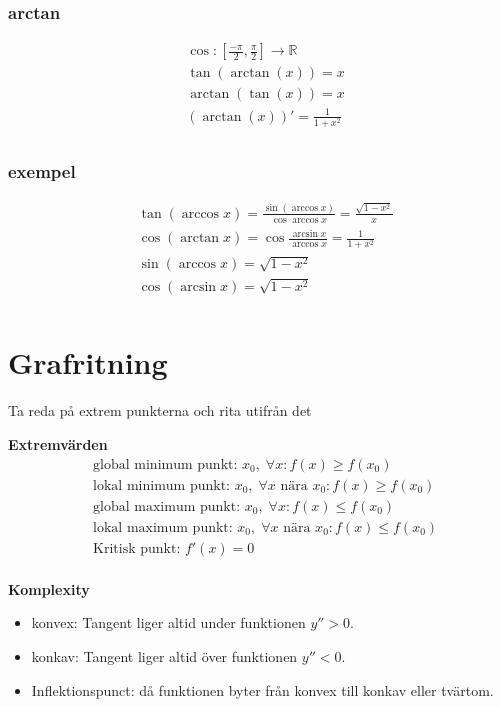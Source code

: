 \begin{multicols}{2}
  \subsubsection{arctan}
  \begin{align*}
    &\cos: [\frac{-\pi}{2},\frac{\pi}{2}] \to \mathbb{R} \\
    &\tan(\arctan(x))=x \\  
    &\arctan(\tan(x))=x \\
    &(\arctan(x))'= \frac{1}{1+x^2} \\
  \end{align*}

  \subsubsection{exempel}
  \begin{align*}
    &\tan{(\arccos{x})} = \frac{\sin{(\arccos{x})}}{\cos{\arccos{x}}}= \frac{\sqrt{1-x^2}}{x} \\
    &\cos{(\arctan{x})} = \cos{\frac{\arcsin{x}}{\arccos{x}}}= \frac{1}{1+x^2} \\ %
    &\sin{(\arccos{x})} = \sqrt{1-x^2} \\
    &\cos{(\arcsin{x})} = \sqrt{1-x^2} \\
  \end{align*}


  \section{Grafritning}
  Ta reda på extrem punkterna och rita utifrån det

  \textbf{Extremvärden}
  \begin{align*}
    &\text{global minimum punkt: } x_0, \; \forall x: f(x) \geq f(x_0) \\
    &\text{lokal minimum punkt: } x_0, \; \forall x \text{ nära } x_0: f(x) \geq f(x_0) \\
    &\text{global maximum punkt: } x_0, \; \forall x: f(x) \leq f(x_0) \\
    &\text{lokal maximum punkt: } x_0, \; \forall x \text{ nära } x_0: f(x) \leq f(x_0) \\
    &\text{Kritisk punkt: } f'(x)=0 \\
  \end{align*}


  \textbf{Komplexity}
  \begin{itemize}
    \item konvex: Tangent liger altid under funktionen $y''>0$.
    \item konkav: Tangent liger altid över funktionen $y''<0$.
    \item Inflektionspunct: då funktionen byter från konvex till konkav eller tvärtom.
  \end{itemize}



\end{multicols}
